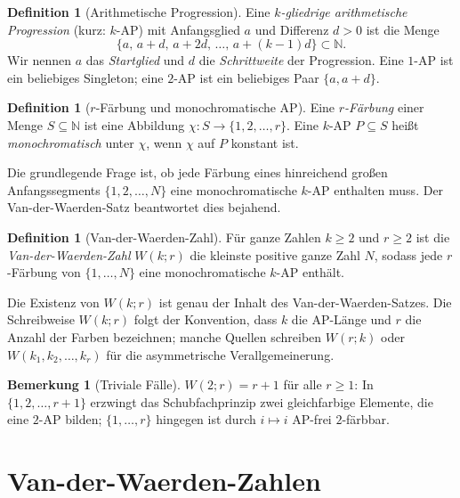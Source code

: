 \documentclass[12pt,a4paper]{amsart}
\theoremstyle{definition}
\newtheorem{definition}[theorem]{Definition}
\newtheorem{remark}[theorem]{Bemerkung}
\newcommand{\N}{\mathbb{N}}
\begin{document}
\begin{definition}[Arithmetische Progression]
Eine \emph{$k$-gliedrige arithmetische Progression} (kurz: $k$-AP) mit Anfangsglied $a$
und Differenz $d > 0$ ist die Menge
\[
  \{a, \, a+d, \, a+2d, \, \ldots, \, a+(k-1)d\} \subset \N.
\]
Wir nennen $a$ das \emph{Startglied} und $d$ die \emph{Schrittweite} der Progression.
Eine $1$-AP ist ein beliebiges Singleton; eine $2$-AP ist ein beliebiges Paar
$\{a, a+d\}$.
\end{definition}

\begin{definition}[$r$-Färbung und monochromatische AP]
Eine \emph{$r$-Färbung} einer Menge $S \subseteq \N$ ist eine Abbildung
$\chi: S \to \{1, 2, \ldots, r\}$.
Eine $k$-AP $P \subseteq S$ heißt \emph{monochromatisch} unter $\chi$, wenn $\chi$
auf $P$ konstant ist.
\end{definition}

Die grundlegende Frage ist, ob jede Färbung eines hinreichend großen Anfangssegments
$\{1, 2, \ldots, N\}$ eine monochromatische $k$-AP enthalten muss.
Der Van-der-Waerden-Satz beantwortet dies bejahend.

\begin{definition}[Van-der-Waerden-Zahl]
Für ganze Zahlen $k \geq 2$ und $r \geq 2$ ist die \emph{Van-der-Waerden-Zahl}
$W(k;r)$ die kleinste positive ganze Zahl $N$, sodass jede $r$-Färbung von
$\{1, \ldots, N\}$ eine monochromatische $k$-AP enthält.
\end{definition}

Die Existenz von $W(k;r)$ ist genau der Inhalt des Van-der-Waerden-Satzes.
Die Schreibweise $W(k; r)$ folgt der Konvention, dass $k$ die AP-Länge und $r$ die
Anzahl der Farben bezeichnen; manche Quellen schreiben $W(r; k)$ oder
$W(k_1, k_2, \ldots, k_r)$ für die asymmetrische Verallgemeinerung.

\begin{remark}[Triviale Fälle]
$W(2; r) = r+1$ für alle $r \geq 1$: In $\{1, 2, \ldots, r+1\}$ erzwingt das
Schubfachprinzip zwei gleichfarbige Elemente, die eine $2$-AP bilden; $\{1,\ldots,r\}$
hingegen ist durch $i \mapsto i$ AP-frei $2$-färbbar.
\end{remark}

\section{Van-der-Waerden-Zahlen}\label{sec:vdw-zahlen}
\end{document}
